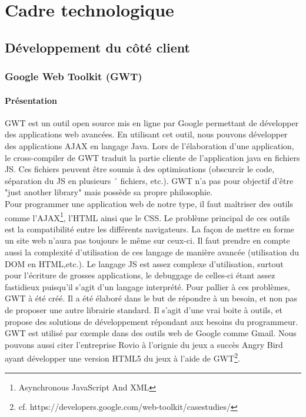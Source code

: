 
\chapter{Cadre technologique}


\section{Développement du côté client}
\subsection{Google Web Toolkit (GWT)}

\subsubsection{Présentation}
GWT est un outil open source mis en ligne par Google permettant de développer des applications web avancées. En utilisant cet outil, nous pouvons développer des applications AJAX en langage Java.
Lors de l'élaboration d'une application, le cross-compiler de GWT traduit la partie cliente de l'application java en 
fichiers JS. Ces fichiers peuvent être soumis à des optimisations (obscurcir le code, séparation du JS en plusieurs 
´
fichiers, etc.). GWT n'a pas pour objectif d'être "just another library" mais possède sa propre philosophie.\\
\newline
\indent
Pour programmer une application web de notre type, il faut maîtriser des outils comme l'AJAX\footnote{Asynchronous JavaScript And XML}, l'HTML ainsi que le CSS. Le problème principal de ces outils est la compatibilité entre les différents navigateurs. La façon de mettre en forme un site web n'aura pas toujours le même sur ceux-ci. Il faut prendre en compte aussi la complexité d'utilisation de ces langage de manière avancée (utilisation du DOM en HTML,etc.). Le langage JS est assez complexe d'utilisation, surtout pour l'écriture de grosses applications, le debuggage de celles-ci étant assez fastidieux puisqu'il s'agit d'un langage interprété.
\newline
\indent
Pour pallier à ces problèmes, GWT à été créé. Il a été élaboré dans le but de répondre à un besoin, et non pas de proposer une autre librairie standard. Il s'agit d'une vrai boite à outils, et propose des solutions de développement répondant aux besoins du programmeur.
\newline
\indent
GWT est utilisé par exemple dans des outils web de Google comme Gmail. Nous pouvons aussi citer l'entreprise Rovio à l'orignie du jeux a succès Angry Bird ayant développer une version HTML5 du jeux à l'aide de GWT\footnote{cf. https://developers.google.com/web-toolkit/casestudies/}.

